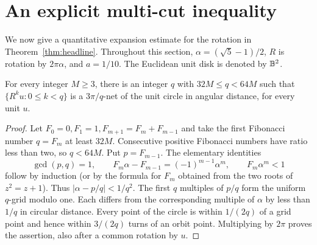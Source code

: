 \section{An explicit multi-cut inequality}
\label{sec:quantitative}
We now give a quantitative expansion estimate for the rotation in
Theorem~\ref{thm:headline}. Throughout this section,
$\alpha=(\sqrt5-1)/2$, $R$ is rotation by $2\pi\alpha$, and
$a=1/10$. The Euclidean unit disk is denoted by $\mathbb B^2$.

\begin{lemma}\label{lem:orbit-net}
For every integer $M\ge3$, there is an integer $q$ with
$32M\le q<64M$ such that $\{R^ku:0\le k<q\}$ is a
$3\pi/q$-net of the unit circle in angular distance, for every unit $u$.
\end{lemma}
\begin{proof}
Let $F_0=0,F_1=1,F_{m+1}=F_m+F_{m-1}$ and take the first Fibonacci
number $q=F_m$ at least $32M$. Consecutive positive Fibonacci numbers
have ratio less than two, so $q<64M$. Put $p=F_{m-1}$. The elementary
identities
\[
 \gcd(p,q)=1,\qquad F_m\alpha-F_{m-1}=(-1)^{m-1}\alpha^m,
 \qquad F_m\alpha^m<1
\]
follow by induction (or by the formula for $F_m$ obtained from the two
roots of $z^2=z+1$). Thus $|\alpha-p/q|<1/q^2$. The first $q$
multiples of $p/q$ form the uniform $q$-grid modulo one. Each differs
from the corresponding multiple of $\alpha$ by less than $1/q$ in
circular distance. Every point of the circle is within $1/(2q)$ of a
grid point and hence within $3/(2q)$ turns of an orbit point. Multiplying
by $2\pi$ proves the assertion, also after a common rotation by $u$.
\end{proof}

